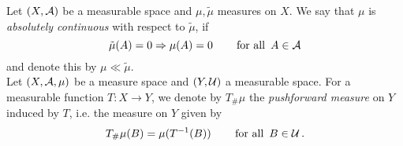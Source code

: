 \documentclass[
     12pt,         %
     a4paper,      %
     BCOR=10mm,     %
     DIV=14,        %
     ]{scrreprt}
\begin{document}
%
%
%
    
    \noindent Let $(X, \operatorname{\mathcal{A}})$ be a measurable space and $\mu, \tilde \mu$ measures on $X$.  We say that $\mu$ is \textit{absolutely continuous} with respect to $\tilde \mu$, if
    \[\tilde \mu(A) = 0 \Rightarrow \mu(A) = 0 \quad \quad  \forAll A\in \A \]
    and denote this by $\mu \ll \tilde \mu$. \\
    Let $(X, \operatorname{\mathcal{A}}, \mu)$ be a measure space and $(Y, \operatorname{\mathcal{U}})$ a measurable space. For a measurable function $T: X \to Y $, 
    we denote by $T_{\#}\mu$ the \textit{pushforward measure} on $Y$ induced by $T$, i.e. the measure on $Y$ given by
    \[T_{\#}\mu(B) = \mu(T^{-1}(B)) \quad \quad \forAll  B \in \U. \]
%
%    
\end{document}
